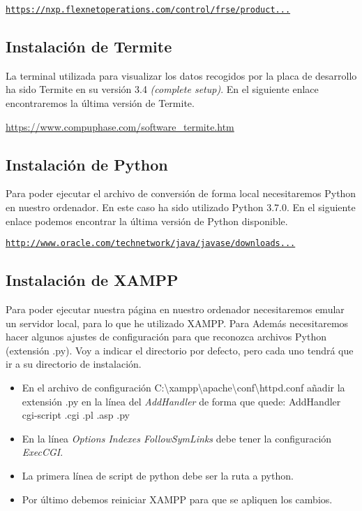 \href{https://nxp.flexnetoperations.com/control/frse/product?entitlementId=402114997&lineNum=1&authContactId=115669057&authPartyId=124808297} {\texttt{https://nxp.flexnetoperations.com/control/frse/product...}}

\subsection{Instalación de Termite}
La terminal utilizada para visualizar los datos recogidos por la placa de desarrollo ha sido Termite en su versión 3.4 \textit{(complete setup)}. En el siguiente enlace encontraremos la última versión de Termite.

\url{https://www.compuphase.com/software_termite.htm}

\subsection{Instalación de Python}
Para poder ejecutar el archivo de conversión de forma local necesitaremos Python en nuestro ordenador. En este caso ha sido utilizado Python 3.7.0.
En el siguiente enlace podemos encontrar la última versión de Python disponible.

\href{http://www.oracle.com/technetwork/java/javase/downloads/javafxscenebuilder-1x-archive-2199384.html}{\texttt{http://www.oracle.com/technetwork/java/javase/downloads...}}

\subsection{Instalación de XAMPP}
Para poder ejecutar nuestra página en nuestro ordenador necesitaremos emular un servidor local, para lo que he utilizado XAMPP. Para  Además necesitaremos hacer algunos ajustes de configuración para que reconozca archivos Python (extensión .py). Voy a indicar el directorio por defecto, pero cada uno tendrá que ir a su directorio de instalación. 
\begin{itemize}
\tightlist
\item
	En el archivo de configuración C:\textbackslash{}xampp\textbackslash{}apache\textbackslash{}conf\textbackslash{}httpd.conf añadir la extensión .py en la línea del \textit{AddHandler} de forma que quede: AddHandler cgi-script .cgi .pl .asp .py
\item
	En la línea \textit{Options Indexes FollowSymLinks} debe tener la configuración \textit{ExecCGI}.
\item
	La primera línea de script de python debe ser la ruta a python.
\item
	Por último debemos reiniciar XAMPP para que se apliquen los cambios.
\end{itemize}

